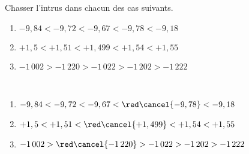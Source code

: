 \begin{exercice*}
    Chasser l'intrus dans chacun des cas suivants.
    {\baselineskip=7mm
    \begin{enumerate}
       \item $-9,84 < -9,72 < -9,67 < -9,78 < -9,18$
       \item $+1,5 < +1,51 < +1,499 < +1,54 < +1,55$
       \item $-1\,002 > -1\,220 > -1\,022 > -1\,202 > -1\,222$
    \end{enumerate}}
 \end{exercice*}
 
 \begin{corrige}
    \ \\ [-7mm]
    {\baselineskip=7mm
    \begin{enumerate}
       \item $-9,84 < -9,72 < -9,67 < {\red\cancel{-9,78}} < -9,18$ 
       \item $+1,5 < +1,51 < {\red\cancel{+1,499}} < +1,54 < +1,55$ 
       \item $-1\,002 > {\red\cancel{-1\,220}} > -1\,022 > -1\,202 > -1\,222$
    \end{enumerate}}
 \end{corrige}
